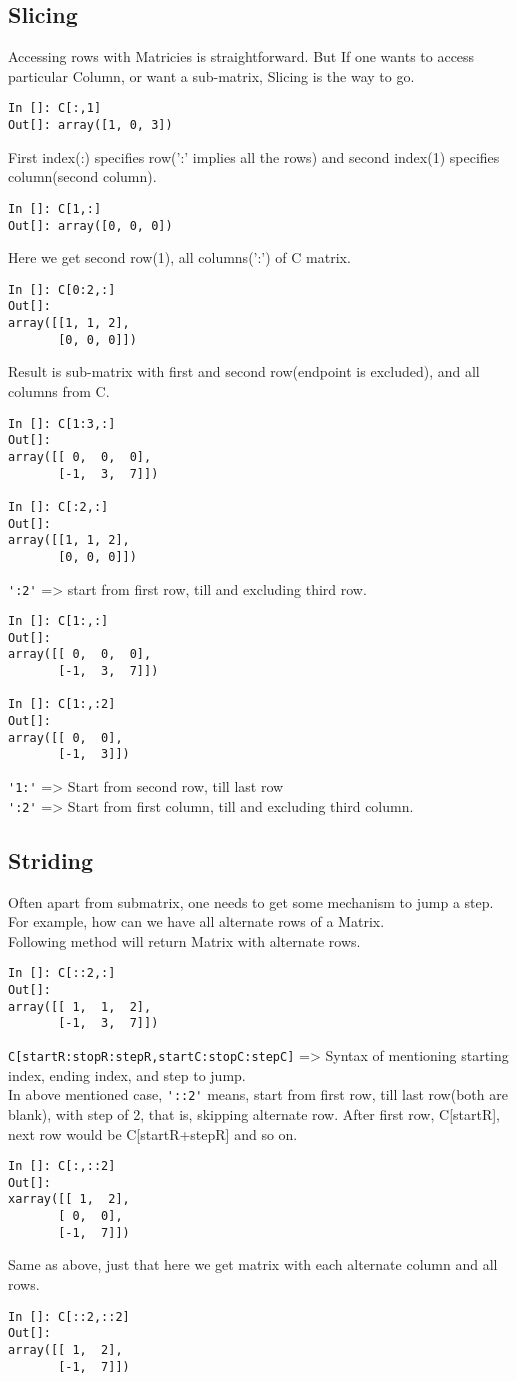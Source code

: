 \documentclass[12pt]{article}
\newcommand{\typ}[1]{\lstinline{#1}}
\begin{document}
\subsection{Slicing}
Accessing rows with Matricies is straightforward. But If one wants to access particular Column, or want a sub-matrix, Slicing is the way to go.
\begin{lstlisting}
In []: C[:,1]
Out[]: array([1, 0, 3])
\end{lstlisting}
First index(:) specifies row(':' implies all the rows) and second index(1) specifies column(second column).
\begin{lstlisting}
In []: C[1,:]
Out[]: array([0, 0, 0])
\end{lstlisting}
Here we get second row(1), all columns(':') of C matrix.
\newpage
\begin{lstlisting}
In []: C[0:2,:]
Out[]: 
array([[1, 1, 2],
       [0, 0, 0]])
\end{lstlisting}
Result is sub-matrix with first and second row(endpoint is excluded), and all columns from C.
\begin{lstlisting}
In []: C[1:3,:]
Out[]: 
array([[ 0,  0,  0],
       [-1,  3,  7]])

In []: C[:2,:]
Out[]: 
array([[1, 1, 2],
       [0, 0, 0]])
\end{lstlisting}
\typ{':2'} => start from first row, till and excluding third row.
\begin{lstlisting}
In []: C[1:,:]
Out[]: 
array([[ 0,  0,  0],
       [-1,  3,  7]])

In []: C[1:,:2]
Out[]: 
array([[ 0,  0],
       [-1,  3]])
\end{lstlisting}
\typ{'1:'} => Start from second row, till last row\\
\typ{':2'} => Start from first column, till and excluding third column.
\newpage
\subsection{Striding}
Often apart from submatrix, one needs to get some mechanism to jump a step. For example, how can we have all alternate rows of a Matrix. \\
Following method will return Matrix with alternate rows.
\begin{lstlisting}
In []: C[::2,:]
Out[]: 
array([[ 1,  1,  2],
       [-1,  3,  7]])
\end{lstlisting}
\typ{C[startR:stopR:stepR,startC:stopC:stepC]} => Syntax of mentioning starting index, ending index, and step to jump.\\
In above mentioned case, \typ{'::2'} means, start from first row, till last row(both are blank), with step of 2, that is, skipping alternate row. After first row, C[startR], next row would be C[startR+stepR] and so on.
\begin{lstlisting}
In []: C[:,::2]
Out[]: 
xarray([[ 1,  2],
       [ 0,  0],
       [-1,  7]])
\end{lstlisting}
Same as above, just that here we get matrix with each alternate column and all rows.
\begin{lstlisting}
In []: C[::2,::2]
Out[]: 
array([[ 1,  2],
       [-1,  7]])
\end{lstlisting}
\end{document}
